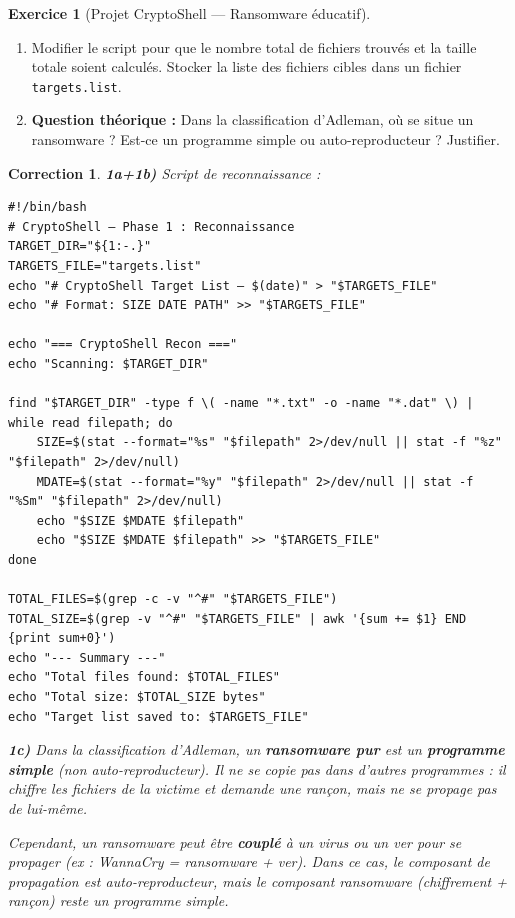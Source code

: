\documentclass[a4paper,11pt]{article}
\theoremstyle{plain}
\newtheorem{correction}{Correction}
\theoremstyle{definition}
\newtheorem{exercice}{Exercice}
\begin{document}
\begin{exercice}[Projet CryptoShell --- Ransomware éducatif]
\begin{enumerate}
\item[\textbf{1b)}] Modifier le script pour que le nombre total de fichiers trouvés et la taille totale soient calculés. Stocker la liste des fichiers cibles dans un fichier \texttt{targets.list}.

\item[\textbf{1c)}] \textbf{Question théorique :} Dans la classification d'Adleman, où se situe un ransomware ? Est-ce un programme simple ou auto-reproducteur ? Justifier.
\end{enumerate}

\begin{correction}

\textbf{1a+1b)} Script de reconnaissance :
\begin{lstlisting}[title=recon.sh (phase1\_recon.sh)]
#!/bin/bash
# CryptoShell — Phase 1 : Reconnaissance
TARGET_DIR="${1:-.}"
TARGETS_FILE="targets.list"
echo "# CryptoShell Target List — $(date)" > "$TARGETS_FILE"
echo "# Format: SIZE DATE PATH" >> "$TARGETS_FILE"

echo "=== CryptoShell Recon ==="
echo "Scanning: $TARGET_DIR"

find "$TARGET_DIR" -type f \( -name "*.txt" -o -name "*.dat" \) | while read filepath; do
    SIZE=$(stat --format="%s" "$filepath" 2>/dev/null || stat -f "%z" "$filepath" 2>/dev/null)
    MDATE=$(stat --format="%y" "$filepath" 2>/dev/null || stat -f "%Sm" "$filepath" 2>/dev/null)
    echo "$SIZE $MDATE $filepath"
    echo "$SIZE $MDATE $filepath" >> "$TARGETS_FILE"
done

TOTAL_FILES=$(grep -c -v "^#" "$TARGETS_FILE")
TOTAL_SIZE=$(grep -v "^#" "$TARGETS_FILE" | awk '{sum += $1} END {print sum+0}')
echo "--- Summary ---"
echo "Total files found: $TOTAL_FILES"
echo "Total size: $TOTAL_SIZE bytes"
echo "Target list saved to: $TARGETS_FILE"
\end{lstlisting}

\textbf{1c)} Dans la classification d'Adleman, un \textbf{ransomware pur} est un \textbf{programme simple} (non auto-reproducteur). Il ne se copie pas dans d'autres programmes : il chiffre les fichiers de la victime et demande une rançon, mais ne se propage pas de lui-même.

Cependant, un ransomware peut être \textbf{couplé} à un virus ou un ver pour se propager (ex : WannaCry = ransomware + ver). Dans ce cas, le composant de propagation est auto-reproducteur, mais le composant ransomware (chiffrement + rançon) reste un programme simple.


\end{correction}
\end{exercice}
\end{document}

